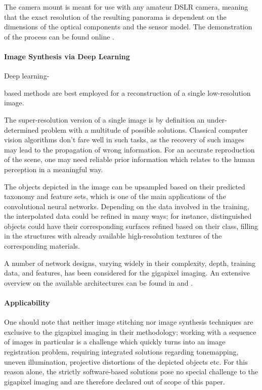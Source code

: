 The camera mount is meant for use with any amateur DSLR camera, meaning that the exact resolution of the resulting panorama is dependent on the dimensions of the optical components and the sensor model. The demonstration of the process can be found online \cite{GigaPanVimeo}.

\paragraph{Image Synthesis via Deep Learning}

Deep learning-

based methods are best employed for a reconstruction of a single low-resolution image. 

The super-resolution version of a single image is by definition an under-determined problem with a multitude of possible solutions. Classical computer vision algorithms don't fare well in such tasks, as the recovery of such images may lead to the propagation of wrong information. For an accurate reproduction of the scene, one may need reliable prior information which relates to the human perception in a meaningful way. 

The objects depicted in the image can be upsampled based on their predicted taxonomy and feature sets, which is one of the main applications of the convolutional neural networks. Depending on the data involved in the training, the interpolated data could be refined in many ways; for instance, distinguished objects could have their corresponding surfaces refined based on their class, filling in the structures with already available high-resolution textures of the corresponding materials.

A number of network designs, varying widely in their complexity, depth, training data, and features, has been considered for the gigapixel imaging. An extensive overview on the available architectures can be found in \cite{Anwar2020ADJ} and \cite{10.1007/978-3-030-36808-1_37}.
 
 
\paragraph{Applicability}

One should note that neither image stitching nor image synthesis techniques are exclusive to the gigapixel imaging in their methodology; working with a sequence of images in particular is a challenge which quickly turns into an image registration problem, requiring integrated solutions regarding tonemapping, uneven illumination, projective distortions of the depicted objects etc. For this reason alone, the strictly software-based solutions pose no special challenge to the gigapixel imaging and are therefore declared out of scope of this paper.

